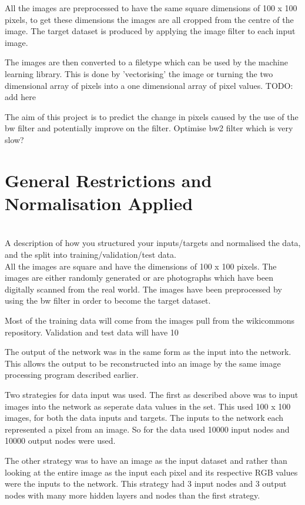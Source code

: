 \documentclass[11pt]{article}
\begin{document}
\begin{page}
All the images are preprocessed to have the same square dimensions of 100 x 100 pixels, to get these dimensions the images are all cropped from the centre of the image. The target dataset is produced by applying the image filter to each input image.

The images are then converted to a filetype which can be used by the machine learning library. This is done by 'vectorising' the image or turning the two dimensional array of pixels into a one dimensional array of pixel values. TODO: add here

The aim of this project is to predict the change in pixels caused by the use of the bw filter and potentially improve on the filter. Optimise bw2 filter which is very slow?

\section{General Restrictions and Normalisation Applied}
\\A description of how you structured your inputs/targets and normalised the data, and the
split into training/validation/test data.\\

All the images are square and have the dimensions of 100 x 100 pixels. The images are either randomly generated or are photographs which have been digitally scanned from the real world. The images have been preprocessed by using the bw filter in order to become the target dataset.

Most of the training data will come from the images pull from the wikicommons repository. Validation and test data will have 10%

The output of the network was in the same form as the input into the network. This allows the output to be reconstructed into an image by the same image processing program described earlier.

Two strategies for data input was used. The first as described above was to input images into the network as seperate data values in the set. This used 100 x 100 images, for both the data inputs and targets. The inputs to the network each represented a pixel from an image. So for the data used 10000 input nodes and 10000 output nodes were used.

The other strategy was to have an image as the input dataset and rather than looking at the entire image as the input each pixel and its respective RGB values were the inputs to the network. This strategy had 3 input nodes and 3 output nodes with many more hidden layers and nodes than the first strategy.


\end{page}
\end{document}
